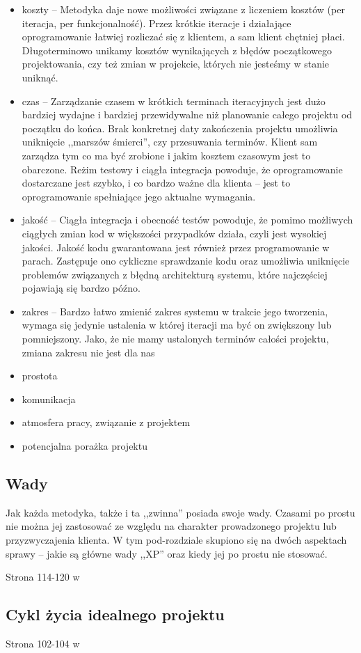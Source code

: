 \begin{itemize}
\item koszty -- Metodyka daje nowe możliwości związane z liczeniem kosztów (per iteracja, per funkcjonalność). Przez krótkie iteracje i działające oprogramowanie łatwiej rozliczać się z klientem, a sam klient chętniej płaci. Długoterminowo unikamy kosztów wynikających z błędów początkowego projektowania, czy też zmian w projekcie, których nie jesteśmy w stanie uniknąć.
\item czas -- Zarządzanie czasem w krótkich terminach iteracyjnych jest dużo bardziej wydajne i bardziej przewidywalne niż planowanie całego projektu od początku do końca. Brak konkretnej daty zakończenia projektu umożliwia uniknięcie ,,marszów śmierci'', czy przesuwania terminów. Klient sam zarządza tym co ma być zrobione i jakim kosztem czasowym jest to obarczone. Reżim testowy i ciągła integracja powoduje, że oprogramowanie dostarczane jest szybko, i co bardzo ważne dla klienta -- jest to oprogramowanie spełniające jego aktualne wymagania.
\item jakość -- Ciągła integracja i obecność testów powoduje, że pomimo możliwych ciągłych zmian kod w większości przypadków działa, czyli jest wysokiej jakości. Jakość kodu gwarantowana jest również przez programowanie w parach. Zastępuje ono cykliczne sprawdzanie kodu oraz umożliwia uniknięcie problemów związanych z błędną architekturą systemu, które najczęściej pojawiają się bardzo późno.
\item zakres -- Bardzo łatwo zmienić zakres systemu w trakcie jego tworzenia, wymaga się jedynie ustalenia w której iteracji ma być on zwiększony lub pomniejszony. Jako, że nie mamy ustalonych terminów całości projektu, zmiana zakresu nie jest dla nas 
\item prostota
\item komunikacja
\item atmosfera pracy, związanie z projektem
\item potencjalna porażka projektu
\end{itemize}


\subsection{Wady}
\label{sec:ZMTOwady}


Jak każda metodyka, także i ta ,,zwinna'' posiada swoje wady. Czasami po prostu nie można jej zastosować ze względu na charakter prowadzonego projektu lub przyzwyczajenia klienta. W tym pod-rozdziale skupiono się na dwóch aspektach sprawy -- jakie są główne wady ,,XP'' oraz kiedy jej po prostu nie stosować.

\todo
Strona 114-120 w \cite{Bec99}

\subsection{Cykl życia idealnego projektu}
\label{sec:ZMTOcykl}

\todo
Strona 102-104 w \cite{Bec99}

\newpage
